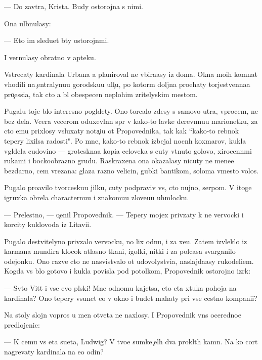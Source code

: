 \documentclass[10pt]{book}
\begin{document}
— Do zavtra, Krista. Budy ostorojna s nimi.

Ona ul{\yi}bnulasy:

— Eto im sledu{\y}et b{\yi}ty ostorojn{\yi}mi.

I vernulasy obratno v apteku.

Vstrecaty kardinala Urbana {\y}a planiroval ne v{\yi}bira{\y}asy iz doma. Okna mo{\y}ih komnat v{\yi}hodili na {\c}entralynu{\y}u gorodsku{\y}u uli{\c}u, po kotor{\yi}m doljna pro{\y}ehaty torjestvenna{\y}a pro{\c}essi{\y}a, tak cto {\y}a b{\yi}l obespecen neplohim zritelyskim mestom.

Pugalu toje b{\yi}lo interesno pogl{\ia}dety. Ono torcalo zdesy s samovo utra, vprocem, ne bez dela. Vcera vecerom oduxevl{\e}nn{\yi}{\y} sp{\e}r v kako{\y}-to lavke derev{\ia}nnu{\y}u marionetku, za cto {\y}emu pri\-xlosy v{\yi}sluxaty nota{\c}i{\y}u ot Pro\-po\-ved\-nika, tak kak ``kako{\y}-to reb{\e}nok tepery lixilsa radosti". Po mne, kako{\y}-to reb{\e}nok izbejal nocn{\yi}h koxmarov, kukla v{\yi}gl{\ia}dela cudovi{\x}no — groteskna{\y}a kopi{\y}a celoveka s cuty v{\yi}t{\ia}nuto{\y} go\-lo\-vo{\y}, xirocenn{\yi}mi rukami i bockoobrazno{\y} grud{\y}u. Raskraxena ona okazalasy nicuty ne mene{\y}e bezdarno, cem v{\yi}rezana: glaza razno{\y} velicin{\yi}, gubki bantikom, soloma vmesto volos.

Pugalo pro{\y}avilo tvorcesku{\y}u jilku, cuty podpraviv vs{\e}, cto nujno, serpom. V itoge igruxka obrela characternu{\y}u i znakomu{\y}u zlove{\x}u{\y}u uhm{\yi}locku.

— Prelestno, — o{\c}enil Pro\-po\-ved\-nik. — Tepery mojex priv{\ia}zaty k ne{\y} ver{\e}vocki i korcity kuklovoda iz Litavi{\y}i.

Pugalo de{\y}stvitelyno priv{\ia}zalo ver{\e}vocku, no lix odnu, i za xe{\y}u. Zatem izvleklo iz karmana mundira klocok atlasno{\y} tkani, igolki, nitki i za polcasa svarganilo odejonku. Ono razve cto ne nasvist{\yi}valo ot udovolystvi{\y}a, naslajda{\y}asy rukodeli{\y}em. Kogda vs{\e} b{\yi}lo gotovo i kukla povisla pod potolkom, Pro\-po\-ved\-nik ostorojno izr{\e}k:

— Sv{\ia}to{\y} Vitt i vse {\y}evo pl{\ia}ski! Mne odnomu kajetsa, cto eta xtuka pohoja na kardinala? Ono tepery v{\yi}sunet {\y}e{\y}o v okno i budet mahaty pri vse{\y} cestno{\y} kompani{\y}i?

Na stoly slojn{\yi}{\y} vopros u men{\ia} otveta ne naxlosy. I Pro\-po\-ved\-nik vn{\e}s oceredno{\y}e predlojeni{\y}e:

— K cemu vs{\ia} eta su{\y}eta, Ludwig? V tvo{\y}e{\y} sumke {\c}el{\yi}h dva pro\-kl{\ia}\-t{\yi}h kamn{\ia}. Na ko{\y} cort nagrevaty kardinala na {\y}e{\x}o odin?
\end{document}
